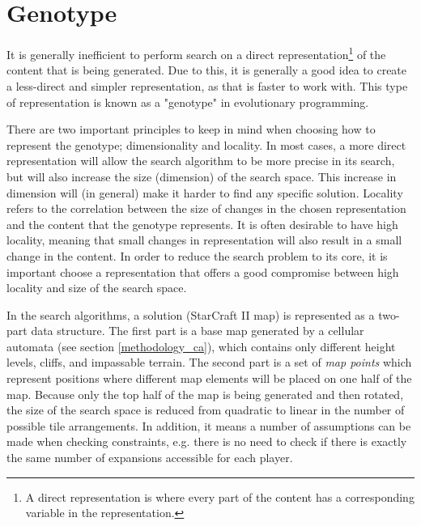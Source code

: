 \section{Genotype}
\label{methodology_genotype}
It is generally inefficient to perform search on a direct representation\footnote{A direct representation is where every part of the content has a corresponding variable in the representation.} of the content that is being generated. Due to this, it is generally a good idea to create a less-direct and simpler representation, as that is faster to work with. This type of representation is known as a "genotype" in evolutionary programming.

There are two important principles to keep in mind when choosing how to represent the genotype; dimensionality and locality. In most cases, a more direct representation will allow the search algorithm to be more precise in its search, but will also increase the size (dimension) of the search space. This increase in dimension will (in general) make it harder to find any specific solution. Locality refers to the correlation between the size of changes in the chosen representation and the content that the genotype represents. It is often desirable to have high locality, meaning that small changes in representation will also result in a small change in the content\cite{togelius2015searchbased}. In order to reduce the search problem to its core, it is important choose a representation that offers a good compromise between high locality and size of the search space. 

In the search algorithms, a solution (StarCraft II map) is represented as a two-part data structure. The first part is a base map generated by a cellular automata (see section \ref{methodology_ca}), which contains only different height levels, cliffs, and impassable terrain. The second part is a set of \textit{map points} which represent positions where different map elements will be placed on one half of the map. Because only the top half of the map is being generated and then rotated, the size of the search space is reduced from quadratic to linear in the number of possible tile arrangements. In addition, it means a number of assumptions can be made when checking constraints, e.g. there is no need to check if there is exactly the same number of expansions accessible for each player.

